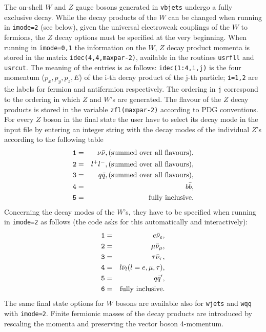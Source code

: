 \documentclass[paper]{JHEP3}
\begin{document}
\begin{appendix}
The on-shell $W$ and $Z$ gauge bosons generated in {\tt vbjets} undergo 
a fully exclusive decay. 
While the decay products of the $W$ can be changed when running in 
{\tt imode=2} (see below), given the universal electroweak couplings of 
the $W$ to 
fermions, the $Z$ decay options must be specified at the very beginning. 
When running in {\tt imode=0,1} the information on the $W$, $Z$ decay product 
momenta is stored in the matrix {\tt idec(4,4,maxpar-2)}, available in 
the routines {\tt usrfll} and {\tt usrcut}. The meaning of the entries 
is as follows: {\tt idec(1:4,i,j)} is the four momentum ($p_x, p_y,
p_z, E$) 
of the i-th decay product of the j-th particle; {\tt i=1,2} are the labels 
for fermion and antifermion respectively. The ordering in {\tt j}
correspond to the ordering in which $Z$ and $W$'s are generated.
 The flavour of the $Z$ decay products is stored 
in the variable {\tt zfl(maxpar-2)} according to PDG conventions. 
For every $Z$ boson in the final state the user have to select its decay 
mode in the input file by entering an integer string with the decay modes 
of the individual $Z$'s according to the following table
\begin{eqnarray}
{\tt 1} &=& \nu {\bar \nu}, ({\rm summed}\, \, {\rm over }\, \, {\rm all}\, \, 
{\rm flavours}), \nonumber \\
{\tt 2} &=& l^+ l^-, ({\rm summed}\, \, {\rm over }\, \, {\rm all}\, \, 
{\rm flavours}), \nonumber \\
{\tt 3} &=& q {\bar q}, ({\rm summed}\, \, {\rm over }\, \, {\rm all}\, \,
{\rm flavours}), \nonumber \\
{\tt 4} &=& b {\bar b}, \nonumber \\
{\tt 5} &=& {\rm fully} \,\, {\rm inclusive}. \nonumber 
\end{eqnarray}
Concerning the decay modes of the $W$'s, they have to be specified 
when running in {\tt imode=2} as follows (the code asks for this
automatically and interactively):
\begin{eqnarray}
{\tt 1} &=& e {\bar \nu_e}, \nonumber \\
{\tt 2} &=& \mu {\bar \nu_\mu}, \nonumber \\
{\tt 3} &=& \tau {\bar \nu_\tau}, \nonumber \\
{\tt 4} &=& l {\bar \nu}_l (l = e, \mu, \tau),  \nonumber  \\
{\tt 5} &=& q {\bar q}',  \nonumber  \\
{\tt 6} &=& {\rm fully} \,\, {\rm inclusive}. \nonumber 
\end{eqnarray}
The same final state options for $W$ bosons are available also 
for {\tt wjets} and {\tt wqq} with {\tt imode=2}.
Finite fermionic masses of the decay products are introduced by rescaling 
the momenta and preserving the vector boson 4-momentum.




\end{appendix}
\end{document}
